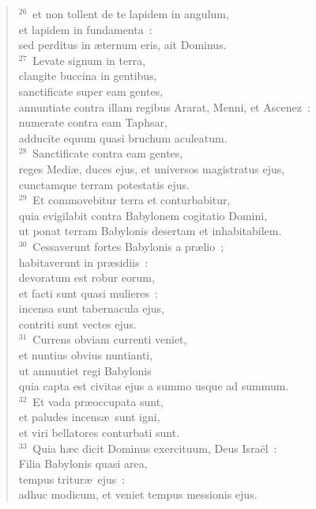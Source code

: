 \begin{verse}
${}^{26}$~et non tollent de te lapidem in angulum,\\ et lapidem in fundamenta~:\\ sed perditus in \ae ternum eris, ait Dominus.\\
${}^{27}$~Levate signum in terra,\\ clangite buccina in gentibus,\\ sanctificate super eam gentes,\\ annuntiate contra illam regibus Ararat, Menni, et Ascenez~:\\ numerate contra eam Taphsar,\\ adducite equum quasi bruchum aculeatum.\\
${}^{28}$~Sanctificate contra eam gentes,\\ reges Medi\ae , duces ejus, et universos magistratus ejus,\\ cunctamque terram potestatis ejus.\\
${}^{29}$~Et commovebitur terra et conturbabitur,\\ quia evigilabit contra Babylonem cogitatio Domini,\\ ut ponat terram Babylonis desertam et inhabitabilem.\\
${}^{30}$~Cessaverunt fortes Babylonis a pr\ae lio~;\\ habitaverunt in pr\ae sidiis~:\\ devoratum est robur eorum,\\ et facti sunt quasi mulieres~:\\ incensa sunt tabernacula ejus,\\ contriti sunt vectes ejus.\\
${}^{31}$~Currens obviam currenti veniet,\\ et nuntius obvius nuntianti,\\ ut annuntiet regi Babylonis\\ quia capta est civitas ejus a summo usque ad summum.\\
${}^{32}$~Et vada pr\ae occupata sunt,\\ et paludes incens\ae\ sunt igni,\\ et viri bellatores conturbati sunt.\\
${}^{33}$~Quia h\ae c dicit Dominus exercituum, Deus Isra\"el~:\\ Filia Babylonis quasi area,\\ tempus tritur\ae\ ejus~:\\ adhuc modicum, et veniet tempus messionis ejus.\\

\end{verse}
